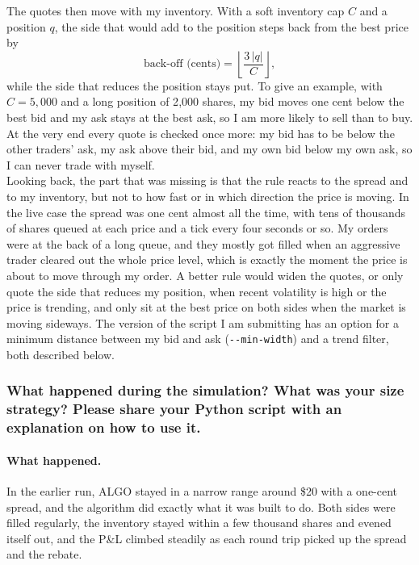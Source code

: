 \documentclass{article}
\begin{document}
\noindent The quotes then move with my inventory. With a soft inventory cap $C$ and a position $q$, the side that would add to the position steps back from the best price by
\begin{equation}
\text{back-off (cents)} = \left\lfloor \frac{3\,|q|}{C} \right\rfloor ,
\end{equation}
while the side that reduces the position stays put. To give an example, with $C = 5{,}000$ and a long position of 2{,}000 shares, my bid moves one cent below the best bid and my ask stays at the best ask, so I am more likely to sell than to buy. At the very end every quote is checked once more: my bid has to be below the other traders' ask, my ask above their bid, and my own bid below my own ask, so I can never trade with myself.\\

\noindent Looking back, the part that was missing is that the rule reacts to the spread and to my inventory, but not to how fast or in which direction the price is moving. In the live case the spread was one cent almost all the time, with tens of thousands of shares queued at each price and a tick every four seconds or so. My orders were at the back of a long queue, and they mostly got filled when an aggressive trader cleared out the whole price level, which is exactly the moment the price is about to move through my order. A better rule would widen the quotes, or only quote the side that reduces my position, when recent volatility is high or the price is trending, and only sit at the best price on both sides when the market is moving sideways. The version of the script I am submitting has an option for a minimum distance between my bid and ask (\texttt{-{}-min-width}) and a trend filter, both described below.

\subsubsection{What happened during the simulation? What was your size strategy? Please share your Python script with an explanation on how to use it.}

\paragraph{What happened.}
In the earlier run, ALGO stayed in a narrow range around \$20 with a one-cent spread, and the algorithm did exactly what it was built to do. Both sides were filled regularly, the inventory stayed within a few thousand shares and evened itself out, and the P\&L climbed steadily as each round trip picked up the spread and the rebate.\\
\end{document}
